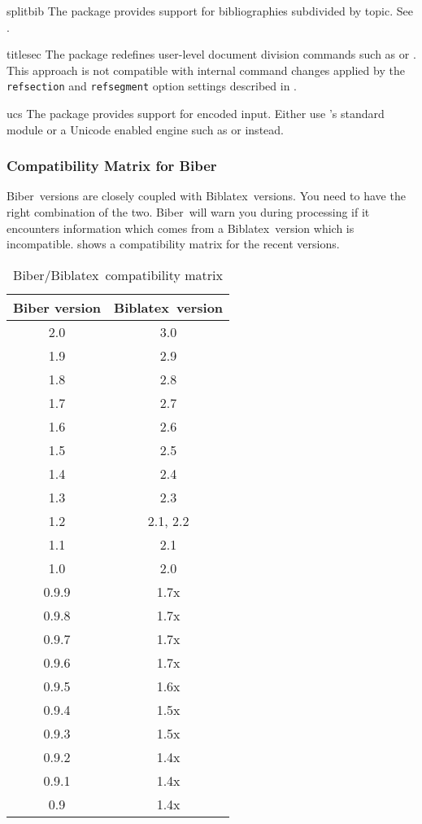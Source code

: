 \documentclass{ltxdockit}[2011/03/25]
\newcommand*{\biber}{Biber\xspace}
\newcommand*{\biblatex}{Biblatex\xspace}
\begin{document}
\begin{marglist}
\item[splitbib]
The  package provides support for bibliographies subdivided by topic. See .

\item[titlesec]
The  package redefines user-level document division commands such as  or . This approach is not compatible with internal command changes applied by the  \texttt{refsection} and \texttt{refsegment} option settings described in .

\item[ucs]
The  package provides support for \utf encoded input. Either use 's standard  module or a Unicode enabled engine such as \xetex or \luatex instead.

\end{marglist}

\subsubsection{Compatibility Matrix for \biber}
\label{int:pre:bibercompat}

\biber\ versions are closely coupled with \biblatex\ versions. You
need to have the right combination of the two. \biber\ will warn you
during processing if it encounters information which comes from a
\biblatex\ version which is incompatible.  shows a
compatibility matrix for the recent versions.

\begin{table}
\tablesetup\centering
\begin{tabular}{cc}
\toprule
\sffamily\bfseries\spotcolor Biber version
  & \sffamily\bfseries\spotcolor \biblatex\ version\\
\midrule
2.0 & 3.0\\
1.9 & 2.9\\
1.8 & 2.8\\
1.7 & 2.7\\
1.6 & 2.6\\
1.5 & 2.5\\
1.4 & 2.4\\
1.3 & 2.3\\
1.2 & 2.1, 2.2\\
1.1 & 2.1\\
1.0 & 2.0\\
0.9.9 & 1.7x\\
0.9.8 & 1.7x\\
0.9.7 & 1.7x\\
0.9.6 & 1.7x\\
0.9.5 & 1.6x\\
0.9.4 & 1.5x\\
0.9.3 & 1.5x\\
0.9.2 & 1.4x\\
0.9.1 & 1.4x\\
0.9 & 1.4x\\
\bottomrule
\end{tabular}
\caption{\biber/\biblatex\ compatibility matrix}
\label{tab:int:pre:bibercompat}
\end{table}
\end{document}
